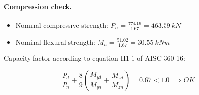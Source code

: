 \paragraph{Compression check.}

\begin{itemize}
\item Nominal compressive strength: $P_n= \frac{774.19}{1.67}= 463.59\ kN$
\item Nominal flexural strength: $M_n= \frac{51.02}{1.67}= 30.55\ kN m$
\end{itemize}

\noindent Capacity factor according to equation H1-1 of AISC 360-16:

\begin{equation}
  \frac{P_d}{P_n}+\frac{8}{9} (\frac{M_{yd}}{M_{yn}}+\frac{M_{zd}}{M_{zn}})= 0.67 < 1.0 \implies OK
  \end{equation}
